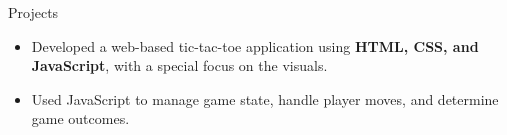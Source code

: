 \documentclass{resume} %
\begin{document}
\begin{workSection}{Projects}
    
         \customItem[
         title=\href{https://github.com/AshkanArabim/tic-tac-toe}{Tic Tac Toe Web Application \faExternalLink},
         duration=Fall 2022,
         ]
         \begin{itemize}
             \vspace{-0.5em}
             \itemsep -6pt {}
             \item Developed a web-based tic-tac-toe application using \textbf{HTML, CSS, and JavaScript}, with a special focus on the visuals.
             \item Used JavaScript to manage game state, handle player moves, and determine game outcomes.
         \end{itemize}


\end{workSection}
\end{document}
